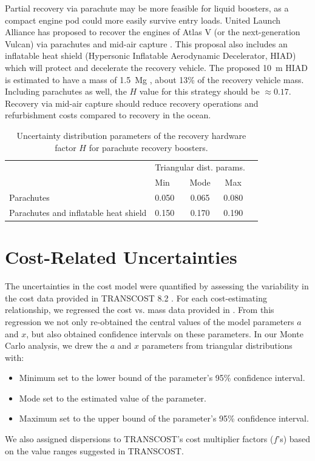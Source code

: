 \documentclass[conf]{../new-aiaa}
\begin{document}
Partial recovery via parachute may be more feasible for liquid boosters, as a compact engine pod could more easily survive entry loads. United Launch Alliance has proposed to recover the engines of Atlas V (or the next-generation Vulcan) via parachutes and mid-air capture \cite{Gravlee2008, Ragab2015}. This proposal also includes an inflatable heat shield (Hypersonic Inflatable Aerodynamic Decelerator, HIAD) which will protect and decelerate the recovery vehicle. The proposed \SI{10}{\meter} HIAD is estimated to have a mass of \SI{1.5}{\mega\gram} \cite{Bose2009}, about 13\% of the recovery vehicle mass. Including parachutes as well, the $H$ value for this strategy should be $\approx 0.17$. Recovery via mid-air capture should reduce recovery operations and refurbishment costs compared to recovery in the ocean.

\begin{table}[hbt!]
    \centering
    \caption{\label{tab:parachute_pref_factor_distributions} Uncertainty distribution parameters of the recovery hardware factor $H$ for parachute recovery boosters.}
    \begin{tabular}{l l c c c}
    \hline
     & \multicolumn{3}{c}{Triangular dist. params.} \\
     & Min & Mode & Max \\
    \hline
    \hline
    Parachutes & 0.050 & 0.065 & 0.080 \\
    Parachutes and inflatable heat shield  & 0.150 & 0.170 & 0.190 \\
    \hline
    \end{tabular}
\end{table}

\section{Cost-Related Uncertainties}

The uncertainties in the cost model were quantified by assessing the variability in the cost data provided in TRANSCOST 8.2 \cite{transcost}. For each cost-estimating relationship, we regressed the cost vs. mass data provided in \cite{transcost}. From this regression we not only re-obtained the central values of the model parameters $a$ and $x$, but also obtained confidence intervals on these parameters. In our Monte Carlo analysis, we drew the $a$ and $x$ parameters from triangular distributions with:

\begin{itemize}
    \item Minimum set to the lower bound of the parameter's 95\% confidence interval.
    \item Mode set to the estimated value of the parameter.
    \item Maximum set to the upper bound of the parameter's 95\% confidence interval.
\end{itemize}

We also assigned dispersions to TRANSCOST's cost multiplier factors ($f$'s) based on the value ranges suggested in TRANSCOST.



\end{document}
